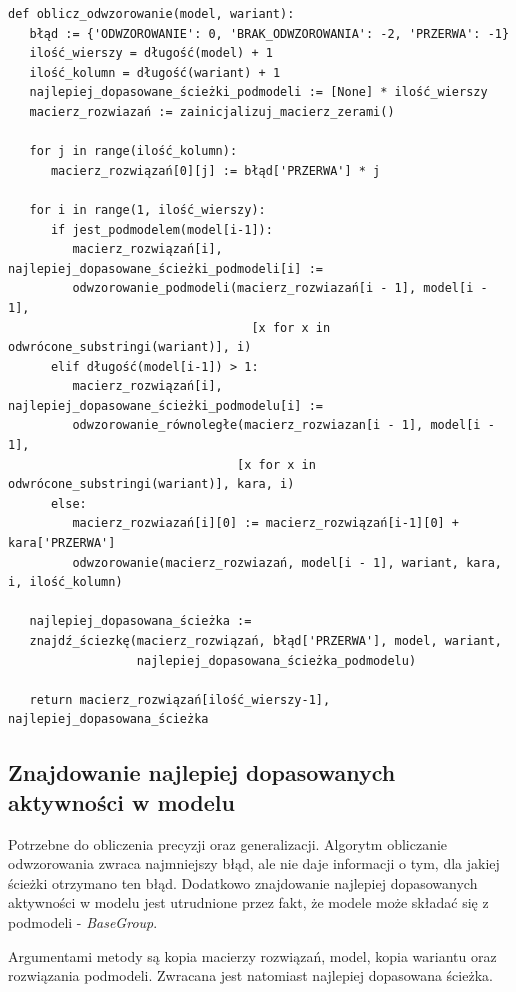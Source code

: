 \lstset{caption=Obliczanie odwzorowania, captionpos=b}
\lstset{label=src:alignment_calculation, frame=single}
\begin{lstlisting}[escapeinside=``]
def oblicz_odwzorowanie(model, wariant):
   błąd := {'ODWZOROWANIE': 0, 'BRAK_ODWZOROWANIA': -2, 'PRZERWA': -1}
   ilość_wierszy = długość(model) + 1
   ilość_kolumn = długość(wariant) + 1
   najlepiej_dopasowane_ścieżki_podmodeli := [None] * ilość_wierszy
   macierz_rozwiazań := zainicjalizuj_macierz_zerami()

   for j in range(ilość_kolumn):
      macierz_rozwiązań[0][j] := błąd['PRZERWA'] * j

   for i in range(1, ilość_wierszy):
      if jest_podmodelem(model[i-1]):
         macierz_rozwiązań[i], najlepiej_dopasowane_ścieżki_podmodeli[i] := 
         odwzorowanie_podmodeli(macierz_rozwiazań[i - 1], model[i - 1],
                                  [x for x in odwrócone_substringi(wariant)], i)
      elif długość(model[i-1]) > 1:
         macierz_rozwiązań[i], najlepiej_dopasowane_ścieżki_podmodelu[i] := 
         odwzorowanie_równoległe(macierz_rozwiazan[i - 1], model[i - 1],
                                [x for x in odwrócone_substringi(wariant)], kara, i)
      else:
         macierz_rozwiazań[i][0] := macierz_rozwiązań[i-1][0] + kara['PRZERWA']
         odwzorowanie(macierz_rozwiazań, model[i - 1], wariant, kara, i, ilość_kolumn)

   najlepiej_dopasowana_ścieżka := 
   znajdź_ściezkę(macierz_rozwiązań, błąd['PRZERWA'], model, wariant, 
                  najlepiej_dopasowana_ścieżka_podmodelu)

   return macierz_rozwiązań[ilość_wierszy-1], najlepiej_dopasowana_ścieżka
\end{lstlisting}

\subsection{Znajdowanie najlepiej dopasowanych aktywności w modelu}
Potrzebne do obliczenia precyzji oraz generalizacji. Algorytm obliczanie odwzorowania zwraca najmniejszy błąd, ale nie daje informacji o tym, dla jakiej ścieżki otrzymano ten błąd. Dodatkowo znajdowanie najlepiej dopasowanych aktywności w modelu jest utrudnione przez fakt, że modele może składać się z podmodeli - \textit{BaseGroup}. 

Argumentami metody są kopia macierzy rozwiązań, model, kopia wariantu oraz rozwiązania podmodeli. Zwracana jest natomiast najlepiej dopasowana ścieżka.

